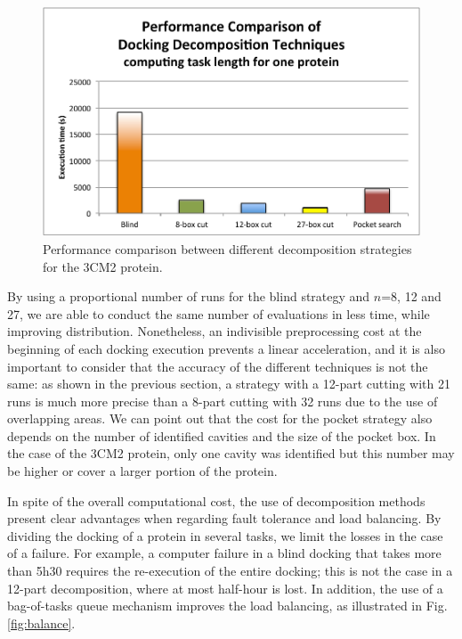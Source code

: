  \begin{figure}
 	\begin{center}
 		\includegraphics[width=0.8\linewidth]{images/Romain/fig7-color} \vspace{-0.3cm}
 		\caption{Performance comparison between different decomposition strategies for the 3CM2 protein.}\label{fig:performance}\vspace{-0.3cm}
 	\end{center}
 \end{figure}
 
 By using a proportional number of runs for the blind strategy and $n$=8, 12 and 27, we are able to conduct the same number of evaluations in less time, while improving distribution. Nonetheless, an indivisible preprocessing cost at the beginning of each docking execution prevents a linear acceleration, and it is also important to consider that the accuracy of the different techniques is not the same: as shown in the previous section, a strategy with a 12-part cutting with 21 runs is much more precise than a 8-part cutting with 32 runs due to the use of overlapping areas. We can point out that the cost for the pocket strategy also depends on the number of identified cavities and the size of the pocket box. In the case of the 3CM2 protein, only one cavity was identified but this number may be higher or cover a larger portion of the protein.
 
 In spite of the overall computational cost, the use of decomposition methods present clear advantages when regarding fault tolerance and load balancing. By dividing the docking of a protein in several tasks, we limit the losses in the case of a failure. For example, a computer failure in a blind docking that takes more than 5h30 requires the re-execution of the entire docking; this is not the case in a 12-part decomposition, where at most half-hour is lost. In addition, the use of a bag-of-tasks queue mechanism improves the load balancing, as illustrated in Fig. \ref{fig:balance}.
 
